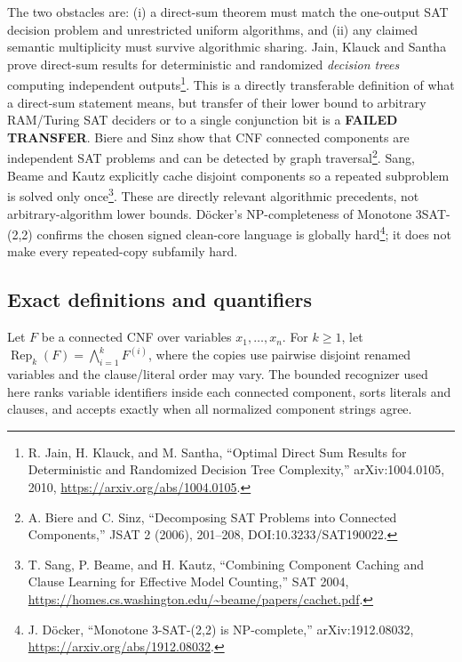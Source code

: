 \documentclass[11pt]{article}
\newcommand{\Rep}{\operatorname{Rep}}
\begin{document}
The two obstacles are: (i) a direct-sum theorem must match the one-output SAT
decision problem and unrestricted uniform algorithms, and (ii) any claimed
semantic multiplicity must survive algorithmic sharing.  Jain, Klauck and
Santha prove direct-sum results for deterministic and randomized
\emph{decision trees} computing independent outputs\footnote{R. Jain,
H. Klauck, and M. Santha, ``Optimal Direct Sum Results for Deterministic and
Randomized Decision Tree Complexity,'' arXiv:1004.0105, 2010,
\url{https://arxiv.org/abs/1004.0105}.}.  This is a directly transferable
definition of what a direct-sum statement means, but transfer of their lower
bound to arbitrary RAM/Turing SAT deciders or to a single conjunction bit is
a \textbf{FAILED TRANSFER}.  Biere and Sinz show that CNF connected components
are independent SAT problems and can be detected by graph traversal\footnote{
A. Biere and C. Sinz, ``Decomposing SAT Problems into Connected Components,''
JSAT 2 (2006), 201--208, DOI:10.3233/SAT190022.}.  Sang, Beame and Kautz
explicitly cache disjoint components so a repeated subproblem is solved only
once\footnote{T. Sang, P. Beame, and H. Kautz, ``Combining Component Caching
and Clause Learning for Effective Model Counting,'' SAT 2004,
\url{https://homes.cs.washington.edu/~beame/papers/cachet.pdf}.}.  These are
directly relevant algorithmic precedents, not arbitrary-algorithm lower
bounds.  Döcker's NP-completeness of Monotone 3SAT-(2,2) confirms the chosen
signed clean-core language is globally hard\footnote{J. Döcker, ``Monotone
3-SAT-(2,2) is NP-complete,'' arXiv:1912.08032,
\url{https://arxiv.org/abs/1912.08032}.}; it does not make every repeated-copy
subfamily hard.

\subsection*{Exact definitions and quantifiers}

Let \(F\) be a connected CNF over variables \(x_1,\ldots,x_n\).  For
\(k\geq1\), let \(\Rep_k(F)=\bigwedge_{i=1}^k F^{(i)}\), where the copies use
pairwise disjoint renamed variables and the clause/literal order may vary.
The bounded recognizer used here ranks variable identifiers inside each
connected component, sorts literals and clauses, and accepts exactly when all
normalized component strings agree.
\end{document}
